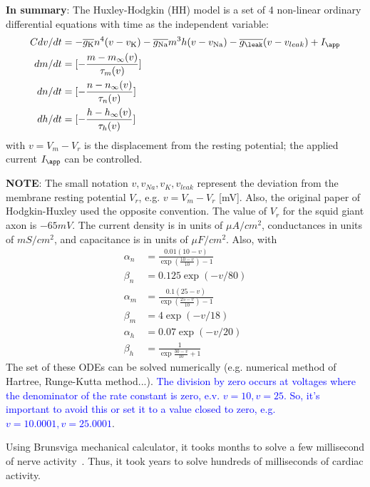 {\bf In summary}: The Huxley-Hodgkin (HH) model is a set of
4 non-linear ordinary differential equations with time as the
independent variable:
\begin{equation}
  \label{eq:159}
  \begin{split}
    Cdv/dt &= - \overline{g_{\ce{K}}}n^4(v-v_{\ce{K}}) - \overline{g_{\ce{Na}}}
    m^3h(v-v_{\ce{Na}}) - \overline{g_{\leak}} (v-v_{leak}) + I_\app
    \\
    dm/dt &= [-\frac{m-m_\infty(v)}{\tau_m(v)}]\\
    dn/dt &= [-\frac{n-n_\infty(v)}{\tau_n(v)}]\\
    dh/dt &= [-\frac{h-h_\infty(v)}{\tau_h(v)}]\\
  \end{split}
\end{equation}
with $v=V_m-V_r$ is the displacement from the resting potential; the
applied current $I_\app$ can be controlled.

{\bf NOTE}: The small notation $v, v_{Na}, v_{K}, v_{leak}$ represent the
deviation from the membrane resting potential $V_r$, e.g. $v=V_m-V_r$ [mV].
Also, the original paper of Hodgkin-Huxley used the opposite convention. The
value of $V_r$ for the squid giant axon is $-65mV$.  The current density is in
units of $\mu A/cm^2$, conductances in units of $mS/cm^2$, and capacitance is in
units of $\mu F/cm^2$. Also, with
\begin{equation}
  \label{eq:262}
  \begin{split}
    \alpha_n &= \frac{0.01 (10-v)}{\exp(\frac{10-v}{10}) - 1}
    \\
    \beta_n &= 0.125 \exp(-v/80) \\
    \alpha_m &= \frac{0.1(25-v)}{\exp(\frac{25-v}{10})-1} \\
    \beta_m &= 4 \exp(-v/18)\\
    \alpha_h &= 0.07 \exp (-v/20)  \\
    \beta_h &= \frac{1}{\exp\frac{30-v}{10} + 1}
  \end{split}
\end{equation}
The set of these ODEs can be solved numerically (e.g. numerical method of
Hartree, Runge-Kutta method...). \textcolor{blue}{The division by zero occurs at
voltages where the denominator of the rate constant is zero, e.v. $v=10, v=25$. So,
it's important to avoid this or set it to a value closed to zero,
e.g. $v=10.0001, v=25.0001$}.

Using Brunsviga mechanical calculator, it tooks months to solve a few
millisecond of nerve activity~\citep{noble2007}. Thus, it took years to solve
hundreds of milliseconds of cardiac activity.

